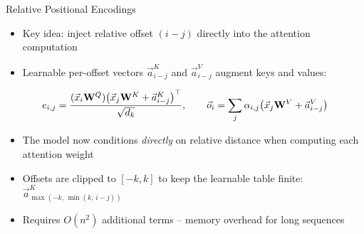 \documentclass[11pt,compress,t,notes=noshow, xcolor=table]{beamer}
\begin{document}

\begin{frame}{Relative Positional Encodings}

\vfill

\begin{itemize}
\item Key idea: inject relative offset $(i-j)$ directly into the attention computation
\item Learnable per-offset vectors $\vec a^K_{i-j}$ and $\vec a^V_{i-j}$ augment keys and values:
\end{itemize}

\begin{equation*}
e_{i,j} = \frac{(\vec x_i{\mathbf{W}}^Q)\bigl(\vec x_j{\mathbf{W}}^K + \vec a^{K}_{i-j}\bigr)^\top}{\sqrt{d_k}},
\qquad
\vec o_i = \sum_j \alpha_{i,j}\bigl(\vec x_j{\mathbf{W}}^V + \vec a^{V}_{i-j}\bigr)
\end{equation*}

\begin{itemize}
\item The model now conditions \textit{directly} on relative distance when computing each attention weight
\item Offsets are clipped to $[-k, k]$ to keep the learnable table finite: $\vec a^K_{\max(-k,\,\min(k,\,i-j))}$
\item Requires $O(n^2)$ additional terms -- memory overhead for long sequences
\end{itemize}

\vfill

\end{frame}

\end{document}
